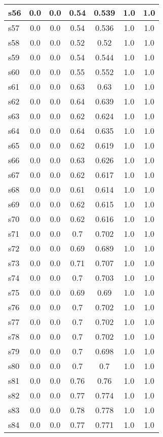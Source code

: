 \documentclass{article}
\begin{document}
\begin{tabular}{|l|c|c|c|c|c|c|}
\hline
s56 &0.0 & 0.0 & 0.54 & 0.539 & 1.0 & 1.0\\
\hline
s57 &0.0 & 0.0 & 0.54 & 0.536 & 1.0 & 1.0\\
\hline
s58 &0.0 & 0.0 & 0.52 & 0.52 & 1.0 & 1.0\\
\hline
s59 &0.0 & 0.0 & 0.54 & 0.544 & 1.0 & 1.0\\
\hline
s60 &0.0 & 0.0 & 0.55 & 0.552 & 1.0 & 1.0\\
\hline
s61 &0.0 & 0.0 & 0.63 & 0.63 & 1.0 & 1.0\\
\hline
s62 &0.0 & 0.0 & 0.64 & 0.639 & 1.0 & 1.0\\
\hline
s63 &0.0 & 0.0 & 0.62 & 0.624 & 1.0 & 1.0\\
\hline
s64 &0.0 & 0.0 & 0.64 & 0.635 & 1.0 & 1.0\\
\hline
s65 &0.0 & 0.0 & 0.62 & 0.619 & 1.0 & 1.0\\
\hline
s66 &0.0 & 0.0 & 0.63 & 0.626 & 1.0 & 1.0\\
\hline
s67 &0.0 & 0.0 & 0.62 & 0.617 & 1.0 & 1.0\\
\hline
s68 &0.0 & 0.0 & 0.61 & 0.614 & 1.0 & 1.0\\
\hline
s69 &0.0 & 0.0 & 0.62 & 0.615 & 1.0 & 1.0\\
\hline
s70 &0.0 & 0.0 & 0.62 & 0.616 & 1.0 & 1.0\\
\hline
s71 &0.0 & 0.0 & 0.7 & 0.702 & 1.0 & 1.0\\
\hline
s72 &0.0 & 0.0 & 0.69 & 0.689 & 1.0 & 1.0\\
\hline
s73 &0.0 & 0.0 & 0.71 & 0.707 & 1.0 & 1.0\\
\hline
s74 &0.0 & 0.0 & 0.7 & 0.703 & 1.0 & 1.0\\
\hline
s75 &0.0 & 0.0 & 0.69 & 0.69 & 1.0 & 1.0\\
\hline
s76 &0.0 & 0.0 & 0.7 & 0.702 & 1.0 & 1.0\\
\hline
s77 &0.0 & 0.0 & 0.7 & 0.702 & 1.0 & 1.0\\
\hline
s78 &0.0 & 0.0 & 0.7 & 0.702 & 1.0 & 1.0\\
\hline
s79 &0.0 & 0.0 & 0.7 & 0.698 & 1.0 & 1.0\\
\hline
s80 &0.0 & 0.0 & 0.7 & 0.7 & 1.0 & 1.0\\
\hline
s81 &0.0 & 0.0 & 0.76 & 0.76 & 1.0 & 1.0\\
\hline
s82 &0.0 & 0.0 & 0.77 & 0.774 & 1.0 & 1.0\\
\hline
s83 &0.0 & 0.0 & 0.78 & 0.778 & 1.0 & 1.0\\
\hline
s84 &0.0 & 0.0 & 0.77 & 0.771 & 1.0 & 1.0\\

\end{tabular}
\end{document}
